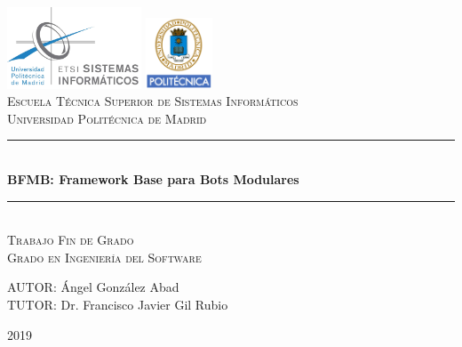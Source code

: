 \documentclass[spanish,12pt, a4paper, twoside]{paper}
\begin{document}
\begin{titlepage}

\newcommand{\HRule}{\rule{\linewidth}{0.5mm}} %

\center %
 
\includegraphics[width=4cm]{recursos/logoEtsisi.png}
  \hspace{8cm}
\includegraphics[width=2cm]{recursos/logo.png}
\\[1cm]

\textsc{\Large Escuela Técnica Superior de Sistemas Informáticos}\\[0.5cm]
\textsc{\large Universidad Politécnica de Madrid}
\\[3cm]


 \HRule \\[0.4cm]
{ \huge \bfseries BFMB: Framework Base para Bots Modulares}\\[0.4cm] %
\HRule \\[2.5cm]

\textsc{\LARGE Trabajo Fin de Grado}\\[0.5cm] 
\textsc{\Large Grado en Ingeniería del Software }\\[2.5cm]

\begin{flushright}
\large
AUTOR: Ángel González Abad\\
TUTOR: Dr. Francisco Javier Gil Rubio
\end{flushright}

\vspace{1.3cm}

{{2019}}\\[3cm]

\vfill %

\end{titlepage}
\end{document}

